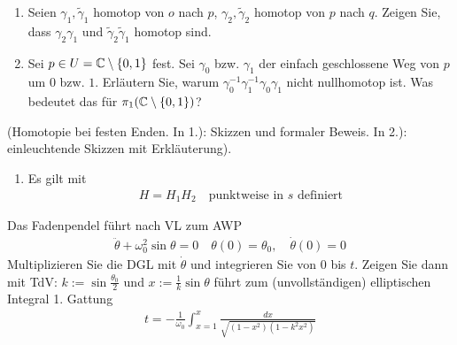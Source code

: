 \documentclass[ngerman]{report}
\begin{document}
\newpage
\begin{question}\hspace{\linewidth}
    \begin{enumerate}
        \item Seien $\gamma_1,\tilde{\gamma}_1$ homotop von $o$ nach $p$, $\gamma_2,\tilde{\gamma}_2$ homotop von $p$ nach $q$. Zeigen Sie, dass $\gamma_2\gamma_1$ und $\tilde{\gamma}_2\tilde{\gamma}_1$ homotop sind.
        \item Sei $p \in U = \mathbb{C}\setminus\{0,1\}$ fest. Sei $\gamma_0$ bzw. $\gamma_1$ der einfach geschlossene Weg von $p$ um $0$ bzw. $1$. Erläutern Sie, warum $\gamma^{-1}_0\gamma^{-1}_1\gamma_0\gamma_1$ nicht nullhomotop ist. Was bedeutet das für $\pi_1(\mathbb{C}\setminus\{0,1\})$?
    \end{enumerate}
    (Homotopie bei festen Enden. In 1.): Skizzen und formaler Beweis. In 2.): einleuchtende Skizzen mit Erkläuterung).
\end{question}
\begin{answer}\hspace{\linewidth}
    \begin{enumerate}
        \item Es gilt mit
        \begin{align*}
            H = H_1H_2 \quad \text{punktweise in $s$ definiert}
        \end{align*}
    \end{enumerate}
\end{answer}
\newpage
\begin{question}
    Das Fadenpendel führt nach VL zum AWP
    \begin{align*}
        \ddot{\theta}+ \omega^2_0\sin\theta = 0 \quad \theta(0) = \theta_0, \quad \dot{\theta}(0) = 0
    \end{align*}
    Multiplizieren Sie die DGL mit $\dot{\theta}$ und integrieren Sie von $0$ bis $t$. Zeigen Sie dann mit TdV: $k := \sin \frac{\theta_0}{2}$ und $x := \frac{1}{k} \sin \theta$ führt zum (unvollständigen) elliptischen Integral 1. Gattung
    \begin{align*}
        t = -\frac{1}{\omega_0} \int_{x = 1}^x \frac{dx}{\sqrt{(1-x^2)(1-k^2x^2)}}
    \end{align*}
\end{question}
\end{document}
